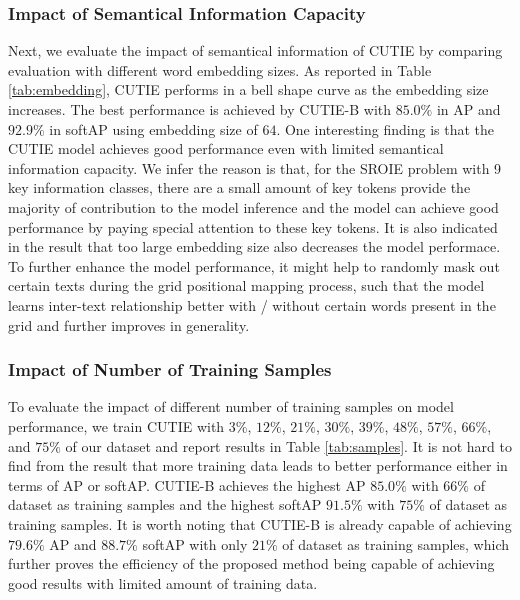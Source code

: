 \documentclass[10pt,twocolumn,letterpaper]{article}
\begin{document}
\subsubsection{Impact of Semantical Information Capacity}
\label{parameters}
Next, we evaluate the impact of semantical information of CUTIE by comparing evaluation with different word embedding sizes. As reported in Table \ref{tab:embedding}, CUTIE performs in a bell shape curve as the embedding size increases. The best performance is achieved by CUTIE-B with $85.0\%$ in AP and $92.9\%$ in softAP using embedding size of $64$. One interesting finding is that the CUTIE model achieves good performance even with limited semantical information capacity. We infer the reason is that, for the SROIE problem with 9 key information classes, there are a small amount of key tokens provide the majority of contribution to the model inference and the model can achieve good performance by paying special attention to these key tokens. It is also indicated in the result that too large embedding size also decreases the model performace. To further enhance the model performance, it might help to randomly mask out certain texts during the grid positional mapping process, such that the model learns inter-text relationship better with / without certain words present in the grid and further improves in generality.

\subsubsection{Impact of Number of Training Samples}
To evaluate the impact of different number of training samples on model performance, we train CUTIE with $3\%$, $12\%$, $21\%$, $30\%$, $39\%$, $48\%$, $57\%$, $66\%$, and $75\%$ of our dataset and report results in Table \ref{tab:samples}. It is not hard to find from the result that more training data leads to better performance either in terms of AP or softAP. CUTIE-B achieves the highest AP $85.0\%$ with $66\%$ of dataset as training samples and the highest softAP $91.5\%$ with $75\%$ of dataset as training samples. It is worth noting that CUTIE-B is already capable of achieving $79.6\%$ AP and $88.7\%$ softAP with only $21\%$ of dataset as training samples, which further proves the efficiency of the proposed method being capable of achieving good results with limited amount of training data.
\end{document}
